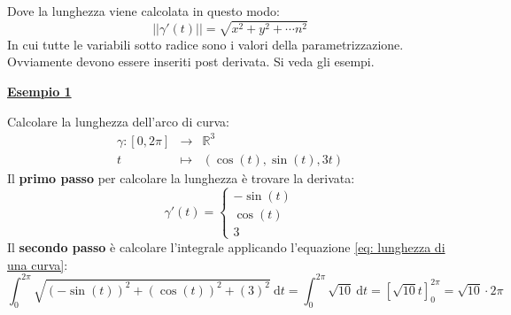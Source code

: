 \documentclass[a4paper]{article}
\newcommand{\example}[1]{\textcolor{Green4}{\textbf{#1}}}
\begin{document}
	\noindent
	Dove la lunghezza viene calcolata in questo modo:
	\begin{equation}\label{eq: lunghezza di una curva}
		\left|\left| \gamma'\left(t\right) \right|\right| = \sqrt{x^{2} + y^{2} + \cdots n^{2}}
	\end{equation}
	In cui tutte le variabili sotto radice sono i valori della parametrizzazione. Ovviamente devono essere inseriti post derivata. Si veda gli esempi.

	\begin{flushleft}
		\example{\underline{Esempio 1}}
	\end{flushleft}
	Calcolare la lunghezza dell'arco di curva:
	\begin{equation*}
		\begin{array}{rcl}
			\gamma:\left[0,2\pi\right] &\rightarrow& \mathbb{R}^{3} \\
			t &\mapsto& \left(\cos\left(t\right), \sin\left(t\right), 3t\right)
		\end{array}
	\end{equation*}
	Il \textbf{primo passo} per calcolare la lunghezza è trovare la derivata:
	\begin{equation*}
		\gamma'\left(t\right) = \begin{cases}
			-\sin\left(t\right) \\
			\cos\left(t\right) \\
			3
		\end{cases}
	\end{equation*}
	Il \textbf{secondo passo} è calcolare l'integrale applicando l'equazione \ref{eq: lunghezza di una curva}:
	\begin{equation*}
		\displaystyle\int_{0}^{2\pi} \sqrt{\left(-\sin\left(t\right)\right)^{2} + \left(\cos\left(t\right)\right)^{2} + \left(3\right)^{2}} \:\mathrm{d}t = \displaystyle\int_{0}^{2\pi} \sqrt{10} \:\mathrm{d}t = \left[\sqrt{10}t\right]_{0}^{2\pi} = \sqrt{10} \cdot 2\pi
	\end{equation*}\newpage
\end{document}

